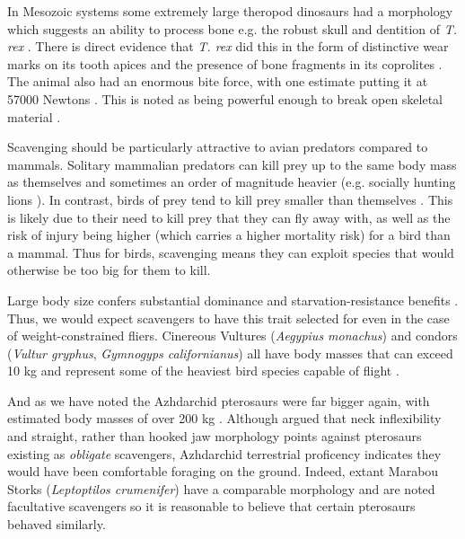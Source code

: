 \documentclass[a4paper,12pt]{article}
\begin{document}
In Mesozoic systems some extremely large theropod dinosaurs had a morphology which suggests an ability to process bone e.g. the robust skull and dentition of \textit{T. rex} \citep{hone2010feeding}.
There is direct evidence that \textit{T. rex} did this in the form of distinctive wear marks on its tooth apices \citep{farlow1994wear,schubert2005wear} and the presence of bone fragments in its coprolites \citep{chin1998king}.
The animal also had an enormous bite force, with one estimate putting it at 57000 Newtons \citep{bates2012estimating}.
This is noted as being powerful enough to break open skeletal material \citep{rayfield2001cranial}.

Scavenging should be particularly attractive to avian predators compared to mammals.
Solitary mammalian predators can kill prey up to the same body mass as themselves and sometimes an order of magnitude heavier (e.g. socially hunting lions \citep{owen2008predator}).
In contrast, birds of prey tend to kill prey smaller than themselves \citep{slagsvold2007prey}.
This is likely due to their need to kill prey that they can fly away with, as well as the risk of injury being higher (which carries a higher mortality risk) for a bird than a mammal.
Thus for birds, scavenging means they can exploit species that would otherwise be too big for them to kill.

Large body size confers substantial dominance and starvation-resistance benefits \citep{ruxton2004obligate}.
Thus, we would expect scavengers to have this trait selected for even in the case of weight-constrained fliers.
Cinereous Vultures (\textit{Aegypius monachus}) and condors (\textit{Vultur gryphus}, \textit{Gymnogyps californianus}) all have body masses that can exceed 10 kg and represent some of the heaviest bird species capable of flight \citep{ferguson2001raptors,donazar2002effects}.

And as we have noted the Azhdarchid pterosaurs were far bigger again, with estimated body masses of over 200 kg \citep{witton2010size}. Although \cite{witton2008reappraisal} argued that neck inflexibility and straight, rather than hooked jaw morphology points against pterosaurs existing as \textit{obligate} scavengers, Azhdarchid terrestrial proficency indicates they would have been comfortable foraging on the ground.
Indeed, extant Marabou Storks (\textit{Leptoptilos crumenifer}) %
have a comparable morphology and are noted facultative scavengers so it is reasonable to believe that certain pterosaurs behaved similarly.
\end{document}
